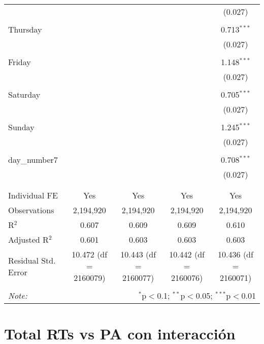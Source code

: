 \documentclass[
]{article}
\begin{document}
\begin{table}[!htbp]
{\begin{tabular}{@{\extracolsep{5pt}}lcccc}
  &  &  &  & (0.027) \\ 
  & & & & \\ 
 Thursday &  &  &  & 0.713$^{***}$ \\ 
  &  &  &  & (0.027) \\ 
  & & & & \\ 
 Friday &  &  &  & 1.148$^{***}$ \\ 
  &  &  &  & (0.027) \\ 
  & & & & \\ 
 Saturday &  &  &  & 0.705$^{***}$ \\ 
  &  &  &  & (0.027) \\ 
  & & & & \\ 
 Sunday &  &  &  & 1.245$^{***}$ \\ 
  &  &  &  & (0.027) \\ 
  & & & & \\ 
 day\_number7 &  &  &  & 0.708$^{***}$ \\ 
  &  &  &  & (0.027) \\ 
  & & & & \\ 
\hline \\[-1.8ex] 
Individual FE & Yes & Yes & Yes & Yes \\ 
Observations & 2,194,920 & 2,194,920 & 2,194,920 & 2,194,920 \\ 
R$^{2}$ & 0.607 & 0.609 & 0.609 & 0.610 \\ 
Adjusted R$^{2}$ & 0.601 & 0.603 & 0.603 & 0.603 \\ 
Residual Std. Error & 10.472 (df = 2160079) & 10.443 (df = 2160077) & 10.442 (df = 2160076) & 10.436 (df = 2160071) \\ 
\hline 
\hline \\[-1.8ex] 
\textit{Note:}  & \multicolumn{4}{r}{$^{*}$p$<$0.1; $^{**}$p$<$0.05; $^{***}$p$<$0.01} \\ 
\end{tabular}
} 
\end{table} 
\newpage
\section{Total RTs vs PA con interacción}
\end{document}
